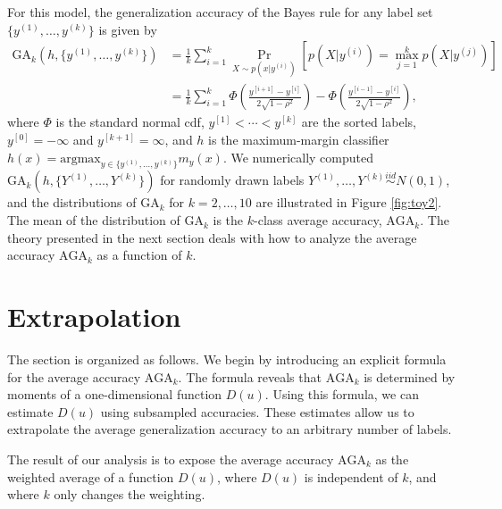 \documentclass[twoside,11pt]{article}
\newcommand{\argmax}{\text{argmax}}
\begin{document}
For this model, the generalization accuracy of the Bayes rule for any
label set $\{y^{(1)},\hdots, y^{(k)}\}$ is given by
\begin{align*}
\text{GA}_k(h, \{y^{(1)},\hdots, y^{(k)}\}) &= \frac{1}{k}\sum_{i=1}^k \Pr_{X \sim p(x|y^{(i)})}[p(X|y^{(i)}) = \max_{j=1}^k p(X|y^{(j)})]
\\&= \frac{1}{k}\sum_{i=1}^k \Phi\left(\frac{y^{[i+1]} - y^{[i]}}{2\sqrt{1-\rho^2}}\right) - \Phi\left(\frac{y^{[i-1]} - y^{[i]}}{2\sqrt{1-\rho^2}}\right),
\end{align*}
where $\Phi$ is the standard normal cdf, $y^{[1]} < \cdots < y^{[k]}$
are the sorted labels, $y^{[0]} = -\infty$ and $y^{[k+1]} =
\infty$,
and $h$ is the maximum-margin classifier $h(x) = \argmax_{y \in \{y^{(1)},\hdots, y^{(k)}\}} m_y(x)$.
We numerically computed $\text{GA}_k(h, \{Y^{(1)},\hdots, Y^{(k)}\})$ for
randomly drawn labels $Y^{(1)},\hdots, Y^{(k)} \stackrel{iid}{\sim} N(0, 1)$, and
the distributions of $\text{GA}_k$ for $k = 2,\hdots, 10$ are
illustrated in Figure \ref{fig:toy2}.  The mean of the distribution of
$\text{GA}_k$ is the $k$-class average accuracy, $\text{AGA}_k$. The
theory presented in the next section deals with how to analyze the
average accuracy $\text{AGA}_k$ as a function of $k$.


\section{Extrapolation}
\label{sec:extrapolation}

The section is organized as follows.  We begin by introducing an
explicit formula for the average accuracy $\text{AGA}_{k}$.  The
formula reveals that $\text{AGA}_{k}$ is determined by moments of a
one-dimensional function ${D}(u)$.  Using this formula, we can estimate
${D}(u)$ using subsampled accuracies.  These estimates allow us to extrapolate the average
generalization accuracy to an arbitrary number of labels.


The result of our analysis is to expose the average accuracy
$\text{AGA}_{k}$ as the weighted average of a function ${D}(u)$,
where ${D}(u)$ is independent of $k$, and where $k$ only changes
the weighting.
\end{document}
